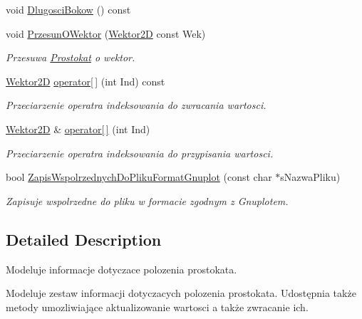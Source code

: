 \begin{DoxyCompactItemize}
void \hyperlink{class_prostokat_acbcd3b7605fb56471203a57a0c9c83ca}{Dlugosci\+Bokow} () const 
\item 
void \hyperlink{class_prostokat_a86df837571e55a267bc8f341a9294d93}{Przesun\+O\+Wektor} (\hyperlink{class_wektor2_d}{Wektor2\+D} const Wek)
\begin{DoxyCompactList}\small\item\em Przesuwa \hyperlink{class_prostokat}{Prostokat} o wektor. \end{DoxyCompactList}\item 
\hypertarget{class_prostokat_a5abad0b4ddc400030250292bbb453b21}{\hyperlink{class_wektor2_d}{Wektor2\+D} \hyperlink{class_prostokat_a5abad0b4ddc400030250292bbb453b21}{operator\mbox{[}$\,$\mbox{]}} (int Ind) const }\label{class_prostokat_a5abad0b4ddc400030250292bbb453b21}

\begin{DoxyCompactList}\small\item\em Przeciarzenie operatra indeksowania do zwracania wartosci. \end{DoxyCompactList}\item 
\hypertarget{class_prostokat_afae69457d9c6e2d87996e515da0e98cd}{\hyperlink{class_wektor2_d}{Wektor2\+D} \& \hyperlink{class_prostokat_afae69457d9c6e2d87996e515da0e98cd}{operator\mbox{[}$\,$\mbox{]}} (int Ind)}\label{class_prostokat_afae69457d9c6e2d87996e515da0e98cd}

\begin{DoxyCompactList}\small\item\em Przeciarzenie operatra indeksowania do przypisania wartosci. \end{DoxyCompactList}\item 
bool \hyperlink{class_prostokat_ae018bfa2c36538c3c8a622d2628e5f24}{Zapis\+Wspolrzednych\+Do\+Pliku\+Format\+Gnuplot} (const char $\ast$s\+Nazwa\+Pliku)
\begin{DoxyCompactList}\small\item\em Zapisuje wspolrzedne do pliku w formacie zgodnym z Gnuplotem. \end{DoxyCompactList}\end{DoxyCompactItemize}


\subsection{Detailed Description}
Modeluje informacje dotyczace polozenia prostokata. 

Modeluje zestaw informacji dotyczacych polozenia prostokata. Udostępnia także metody umozliwiające aktualizowanie wartosci a także zwracanie ich. 

